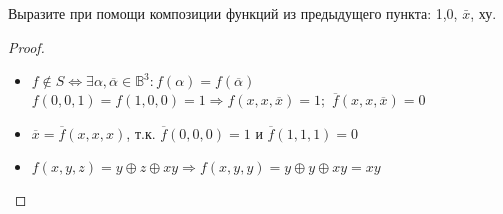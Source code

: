 \begin{problem}
    Выразите при помощи композиции функций из предыдущего пункта: 1,0, $\bar{x}$, ху.
\end{problem}

\begin{proof} $ $\\
    \begin{itemize}
        \item $f \notin S \Leftrightarrow \exists \alpha, \overline{\alpha} \in \mathbb{B}^3: f(\alpha) = f(\overline{\alpha})$\\
        $f(0, 0, 1) = f(1, 0, 0) = 1 \Rightarrow f(x, x, \overline{x}) = 1;$ $\overline{f}(x, x, \overline{x}) = 0$
        \item $\overline{x} = \overline{f}(x, x, x)$, т.к. $\overline{f}(0,0,0) = 1$ и $\overline{f}(1, 1, 1) = 0 $
        \item $f(x, y, z) = y \oplus z \oplus xy \Rightarrow f(x, y, y) = y \oplus y \oplus xy = xy$
    \end{itemize}
\end{proof}